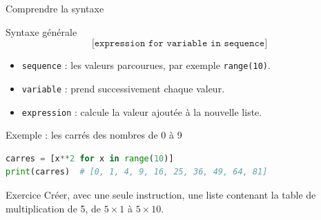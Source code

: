 \documentclass[10pt]{beamer}
\begin{document}
\begin{frame}[fragile]{Comprendre la syntaxe}

\begin{alertblock}{Syntaxe générale}
\[
\texttt{[expression for variable in sequence]}
\]
\end{alertblock}

\begin{itemize}
    \item \texttt{sequence} : les valeurs parcourues, par exemple \texttt{range(10)}.
    \item \texttt{variable} : prend successivement chaque valeur.
    \item \texttt{expression} : calcule la valeur ajoutée à la nouvelle liste.
\end{itemize}

\begin{exampleblock}{Exemple : les carrés des nombres de 0 à 9}
\begin{lstlisting}[language=Python]
carres = [x**2 for x in range(10)]
print(carres)  # [0, 1, 4, 9, 16, 25, 36, 49, 64, 81]
\end{lstlisting}
\end{exampleblock}

\pause

\begin{block}{Exercice}
Créer, avec une seule instruction, une liste contenant
la table de multiplication de 5, de $5 \times 1$ à $5 \times 10$.
\end{block}

\end{frame}
\end{document}
